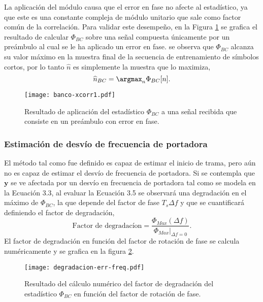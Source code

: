 La aplicación del módulo causa que el error en fase no afecte al estadístico, ya que este es una constante compleja de módulo unitario que sale como factor común de la correlación. Para validar este desempeño, en la Figura \ref{fig:banco-xcorr1} se grafica el resultado de calcular $\Phi_{BC}$ sobre una señal compuesta únicamente por un preámbulo al cual se le ha aplicado un error en fase. se observa que $\Phi_{BC}$ alcanza su valor máximo en la muestra final de la secuencia de entrenamiento de símbolos cortos, por lo tanto $\widehat{n}$ es simplemente la muestra que lo maximiza,
\begin{equation}
    \widehat{n}_{BC} = \argmax_n\Phi_{BC}[n].
\end{equation}

\begin{figure}[t]
    \centering{}\texttt{[image: banco-xcorr1.pdf]}
    \caption{Resultado de aplicación del estadístico $\Phi_{BC}$ a una señal recibida que consiste en un preámbulo con error en fase.\label{fig:banco-xcorr1}}  
\end{figure}

\subsubsection{Estimación de desvío de frecuencia de portadora}
\label{Ss:ch3-banco-frecuencias}
El método tal como fue definido es capaz de estimar el inicio de trama, pero aún no es capaz de estimar el desvío de frecuencia de portadora. Si se contempla que $\mathbf{y}$ se ve afectada por un desvío en frecuencia de portadora tal como se modela en la Ecuación 3.3, al evaluar la Ecuación 3.5 se observará una degradación en el máximo de $\Phi_{BC}$, la que depende del factor de fase $T_s\Delta f$ y que se cuantificará definiendo el factor de degradación,
\begin{equation}
    \text{Factor de degradacíon} = \frac{\Phi_{Max}(\Delta f)}{\Phi_{Max}\lvert_{\Delta f = 0}}.
\end{equation}
El factor de degradación en función del factor de rotación de fase se calcula numéricamente y se grafica en la figura \ref{fig:degradacion}.
\begin{figure}[t]
    \centering{}\texttt{[image: degradacion-err-freq.pdf]}
    \caption{Resultado del cálculo numérico del factor de degradación del estadístico $\Phi_{BC}$ en función del factor de rotación de fase.\label{fig:degradacion}}  
\end{figure}


